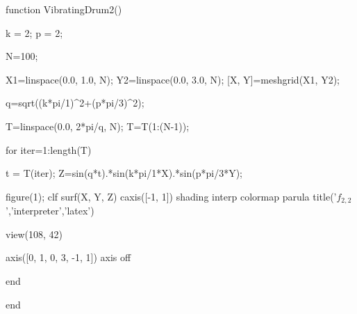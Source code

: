 \begin{codematlab}
function VibratingDrum2()

k = 2;
p = 2;

N=100; %

X1=linspace(0.0, 1.0, N); 
Y2=linspace(0.0, 3.0, N);
[X, Y]=meshgrid(X1, Y2);

q=sqrt((k*pi/1)^2+(p*pi/3)^2);

T=linspace(0.0, 2*pi/q, N); 
T=T(1:(N-1));

for iter=1:length(T)

t = T(iter);
Z=sin(q*t).*sin(k*pi/1*X).*sin(p*pi/3*Y);

figure(1); clf
surf(X, Y, Z)
caxis([-1, 1])
shading interp
colormap parula
title('$f_{2,2}$','interpreter','latex')

view(108, 42)

axis([0, 1, 0, 3, -1, 1])
axis off


end

end

\end{codematlab}